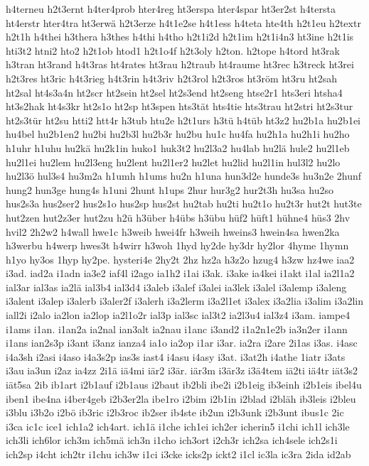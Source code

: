 {h4terneu
h2t3ernt
h4ter4prob
hter4reg
ht3erspa
hter4spar
ht3er2st
h4tersta
ht4erstr
hter4tra
ht3erwä
h2t3erze
h4t1e2se
h4t1ess
h4teta
hte4th
h2t1eu
h2textr
h2t1h
h4thei
h3thera
h3thes
h4thi
h4tho
h2t1i2d
h2t1im
h2t1i4n3
ht3ine
h2t1is
hti3t2
htni2
hto2
h2t1ob
htod1
h2t1o4f
h2t3oly
h2ton.
h2tope
h4tord
ht3rak
h3tran
ht3rand
h4t3ras
ht4rates
ht3rau
h2traub
ht4raume
ht3rec
h3treck
ht3rei
h2t3res
ht3ric
h4t3rieg
h4t3rin
h4t3riv
h2t3rol
h2t3ros
ht3röm
ht3ru
ht2sah
ht2sal
ht4s3a4n
ht2scr
ht2sein
ht2sel
ht2s3end
ht2seng
htse2r1
hts3eri
htsha4
ht3s2hak
ht4s3kr
ht2s1o
ht2sp
ht3spen
hts3tät
hts4tie
hts3trau
ht2stri
ht2s3tur
ht2s3tür
ht2su
htti2
htt4r
h3tub
htu2e
h2t1urs
h3tü
h4tüb
ht3z2
hu2b1a
hu2b1ei
hu4bel
hu2b1en2
hu2bi
hu2b3l
hu2b3r
hu2bu
hu1c
hu4fa
hu2h1a
hu2h1i
hu2ho
h1uhr
h1uhu
hu2kä
hu2k1in
huko1
huk3t2
hu2l3a2
hu4lab
hu2lä
hule2
hu2l1eb
hu2l1ei
hu2lem
hu2l3eng
hu2lent
hu2l1er2
hu2let
hu2lid
hu2l1in
hul3l2
hu2lo
hu2l3ö
hul3s4
hu3m2a
h1umh
h1ums
hu2n
h1una
hun3d2e
hunde3s
hu3n2e
2hunf
hung2
hun3ge
hung4s
h1uni
2hunt
h1ups
2hur
hur3g2
hur2t3h
hu3sa
hu2so
hus2s3a
hus2ser2
hus2s1o
hus2sp
hus2st
hu2tab
hu2ti
hu2t1o
hu2t3r
hut2t
hut3te
hut2zen
hut2z3er
hut2zu
h2ü
h3über
h4übs
h3übu
hüf2
hüft1
hühne4
hüs3
2hv
hvil2
2h2w2
h4wall
hwe1c
h3weib
hwei4fr
h3weih
hweins3
hwein4sa
hwen2ka
h3werbu
h4werp
hwes3t
h4wirr
h3woh
1hyd
hy2de
hy3dr
hy2lor
4hyme
1hymn
h1yo
hy3os
1hyp
hy2pe.
hysteri4e
2hy2t
2hz
hz2a
h3z2o
hzug4
h3zw
hz4we
iaa2
i3ad.
iad2a
i1adn
ia3e2
iaf4l
i2ago
ia1h2
i1ai
i3ak.
i3ake
ia4kei
i1akt
i1al
ia2l1a2
ial3ar
ial3as
ia2lä
ial3b4
ial3d4
i3aleb
i3alef
i3alei
ia3lek
i3alel
i3alemp
i3aleng
i3alent
i3alep
i3alerb
i3aler2f
i3alerh
i3a2lerm
i3a2l1et
i3alex
i3a2lia
i3alim
i3a2lin
iall2i
i2alo
ia2lon
ia2lop
ia2l1o2r
ial3p
ial3sc
ial3t2
ia2l3u4
ial3z4
i3am.
iampe4
i1ams
i1an.
i1an2a
ia2nal
ian3alt
ia2nau
i1anc
i3and2
i1a2n1e2b
ia3n2er
i1ann
i1ans
ian2s3p
i3ant
i3anz
ianza4
ia1o
ia2op
i1ar
i3ar.
ia2ra
i2are
2i1as
i3as.
i4asc
i4a3sh
i2asi
i4aso
i4a3s2p
ias3s
iast4
i4asu
i4asy
i3at.
i3at2h
i4athe
1iatr
i3ats
i3au
ia3un
i2az
ia4zz
2i1ä
iä4mi
iär2
i3är.
iär3m
i3är3z
i3ä4tem
iä2ti
iä4tr
iät3s2
iät5sa
2ib
ib1art
i2b1auf
i2b1aus
i2baut
ib2bli
ibe2i
i2b1eig
ib3einh
i2b1eis
ibel4u
iben1
ibe4na
i4ber4geb
i2b3er2la
ibe1ro
i2bim
i2b1in
i2blad
i2bläh
ib3leis
i2bleu
i3blu
i3b2o
i2bö
ib3ric
i2b3roc
ib2ser
ib4ste
ib2un
i2b3unk
i2b3unt
ibus1c
2ic
i3ca
ic1c
ice1
ich1a2
ich4art.
ich1ä
i1che
ich1ei
ich2er
icherin5
i1chi
ich1l
ich3le
ich3li
ich6lor
ich3m
ich5mä
ich3n
i1cho
ich3ort
i2ch3r
ich2sa
ich4sele
ich2s1i
ich2sp
i4cht
ich2tr
i1chu
ich3w
i1ci
i3cke
icks2p
ickt2
i1cl
ic3la
ic3ra
2ida
id2ab
}
